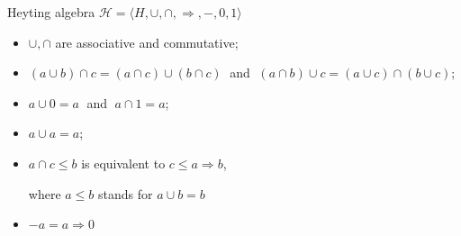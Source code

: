 \documentclass[sans]{beamer}
\begin{document}
\begin{frame}{Heyting algebra}
  $\mathcal{H} = \langle H, \cup, \cap, \Rightarrow, -, 0, 1 \rangle$
  \begin{itemize}
    \item $\cup, \cap$ are associative and commutative;
    \item $(a \cup b) \cap c = (a \cap c) \cup (b \cap c) \;$ and
          $\; (a \cap b) \cup c = (a \cup c) \cap (b \cup c)$;
    \item $a \cup 0 = a \;$ and $\; a \cap 1 = a$;
    \item $a \cup a = a$;
    \item $a \cap c \leq b$ is equivalent to $c \leq a \Rightarrow b$,
      
      where $a \leq b$ stands for $a \cup b = b$

    \item $-a = a \Rightarrow 0$
 
  \end{itemize}
\end{frame}
\end{document}
